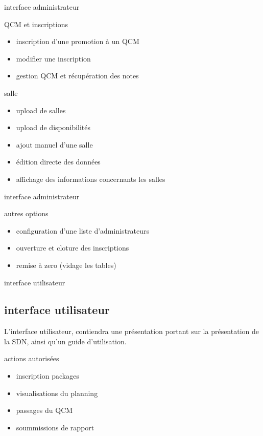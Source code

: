 \documentclass{beamer}
\begin{document}
\begin{frame}{interface administrateur}
	\begin{block}{QCM et inscriptions}
		\begin{itemize}
			\item inscription d'une promotion à un QCM
			\item modifier une inscription
			\item gestion QCM et récupération des notes
		\end{itemize}	
	\end{block}

	\begin{block}{salle}
		\begin{itemize}
			\item upload de salles
			\item upload de disponibilités
			\item ajout manuel d'une salle
			\item édition directe des données
			\item affichage des informations concernants les salles
		\end{itemize}
	\end{block}	
\end{frame}

\begin{frame}{interface administrateur}
	\begin{block}{autres options}
		\begin{itemize}
			\item configuration d'une liste d'administrateurs
			\item ouverture et cloture des inscriptions
			\item remise à zero (vidage les tables)
		\end{itemize}
	\end{block}
\end{frame}

\begin{frame}{interface utilisateur}
  \subsection {interface utilisateur}
	L'interface utilisateur, contiendra une présentation portant sur la présentation de la SDN, ainsi qu'un guide d'utilisation.
	\begin{block}{actions autorisées}
		\begin{itemize}
			\item inscription packages
			\item visualisations du planning
			\item passages du QCM
			\item soummissions de rapport
		\end{itemize}
	\end{block}
\end{frame}
\end{document}
